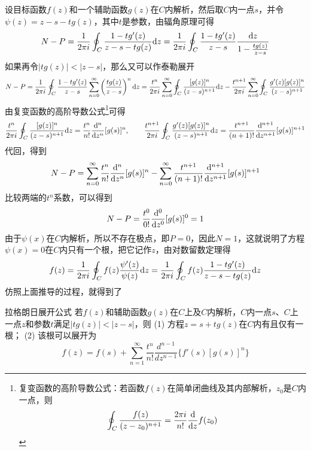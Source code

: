 设目标函数\(f(z)\)和一个辅助函数\(g(z)\)在\(C\)内解析，然后取\(C\)内一点\(s\)，并令\(\psi(z) = z-s-tg(z)\)，其中\(t\)是参数，由辐角原理可得
\[N-P=\frac{1}{2\pi i}\oint_{C}\frac{1-tg'(z)}{z-s-tg(z)}{\rm d}z = \frac{1}{2\pi i}\oint_{C}\frac{1-tg'(z)}{z-s}\frac{{\rm d}z}{1-\frac{tg(z)}{z-s}}\]
如果再令\(|tg(z)|<|z-s|\)，那么又可以作泰勒展开
\[N-P = \frac{1}{2\pi i}\oint_{C}\frac{1-tg'(z)}{z-s}\sum_{n=0}^{\infty}\left(\frac{tg(z)}{z-s}\right)^n{\rm d}z = \frac{t^n}{2\pi i}\sum_{n=0}^{\infty}\oint_{C}\frac{[g(z)]^n}{(z-s)^{n+1}}{\rm d}z-\frac{t^{n+1}}{2 \pi i}\sum_{n=0}^{\infty}\oint_{C}\frac{g'(z)[g(z)]^{n}}{(z-s)^{n+1}}\]
由复变函数的高阶导数公式\footnote{复变函数的高阶导数公式：若函数\(f(z)\)在简单闭曲线及其内部解析，\(z_0\)是\(C\)内一点，则\[\oint_C \frac{f(z)}{(z-z_0)^{n+1}} = \frac{2\pi i}{n!}\dfrac{{\rm d}}{{\rm d}z}f(z_0)\]}可得
\[\frac{t^n}{2\pi i}\oint_{C}\frac{[g(z)]^n}{(z-s)^{n+1}}{\rm d}z = \frac{t^{n}}{n!}\frac{{\rm d}^n}{{\rm d}z^n}[g(s)]^{n}, \qquad \frac{t^{n+1}}{2\pi i}\oint_{C}\frac{g'(z)[g(z)]^n}{(z-s)^{n+1}}{\rm d}z = \frac{t^{n+1}}{(n+1)!}\frac{{\rm d}^{n+1}}{{\rm d}z^{n+1}}[g(s)]^{n+1}\]
代回，得到
\[N-P=\sum_{n=0}^{\infty}\frac{t^{n}}{n!}\frac{{\rm d}^n}{{\rm d}z^n}[g(s)]^{n}-\sum_{n=0}^{\infty}\frac{t^{n+1}}{(n+1)!}\frac{{\rm d}^{n+1}}{{\rm d}z^{n+1}}[g(s)]^{n+1}\]
比较两端的\(t^n\)系数，可以得到
\[N-P=\frac{t^{0}}{0!}\frac{{\rm d}^0}{{\rm d}z^0}[g(s)]^{0}=1\]
由于\(\psi(x)\)在\(C\)内解析，所以不存在极点，即\(P=0\)，因此\(N=1\)，这就说明了方程\(\psi(x)=0\)在\(C\)内只有一个根，把它记作\(z\)，由对数留数定理得
\[f(z)=\frac{1}{2\pi i}\oint_{C}f(z)\frac{\psi'(z)}{\psi(z)}{\rm d}z = \frac{1}{2\pi i}\oint_{C}f(z)\frac{1-tg'(z)}{z-s-tg(z)}{\rm d}z\]
仿照上面推导的过程，就得到了
\begin{theorem}{拉格朗日展开公式}
    若\(f(z)\)和辅助函数\(g(z)\)在\(C\)上及\(C\)内解析，\(C\)内一点\(s\)、\(C\)上一点\(z\)和参数\(t\)满足\(|tg(z)|<|z-s|\)，则\newline
    (1) 方程\(z=s+tg(z)\)在\(C\)内有且仅有一根；\newline
    (2) 该根可以展开为
    \[f(z) = f(s)+\sum_{n=1}^{\infty}\frac{t^n}{n!}\frac{d^{n-1}}{dz^{n-1}}\{f'(s)[g(s)]^n\}\]
\end{theorem}


